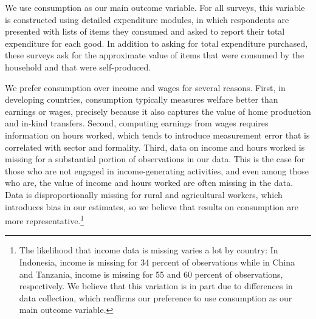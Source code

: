 \documentclass[12pt]{article}
\begin{document}

We use consumption as our main outcome variable. For all surveys, this variable is constructed using detailed expenditure modules, in which respondents are presented with lists of items they consumed and asked to report their total expenditure for each good. In addition to asking for total expenditure purchased, these surveys ask for the approximate value of items that were consumed by the household and that were self-produced.  

We prefer consumption over income and wages for several reasons. 
First, in developing countries, consumption typically measures welfare better than earnings or wages, precisely because it also captures the value of home production and in-kind transfers.
Second, computing earnings from wages requires information on hours worked, which tends to introduce measurement error that is correlated with sector and formality.
Third, data on income and hours worked is missing for a substantial portion of observations in our data. This is the case for those who are not engaged in income-generating activities, and even among those who are, the value of income and hours worked are often missing in the data. Data is disproportionally missing for rural and agricultural workers, which introduces bias in our estimates, so we believe that results on consumption are more representative.\footnote{The likelihood that income data is missing varies a lot by country: In Indonesia, income is missing for 34 percent of observations while in China and Tanzania, income is missing for 55 and 60 percent of observations, respectively. We believe that this variation is in part due to differences in data collection, which reaffirms our preference to use consumption as our main outcome variable.}  
\end{document}
